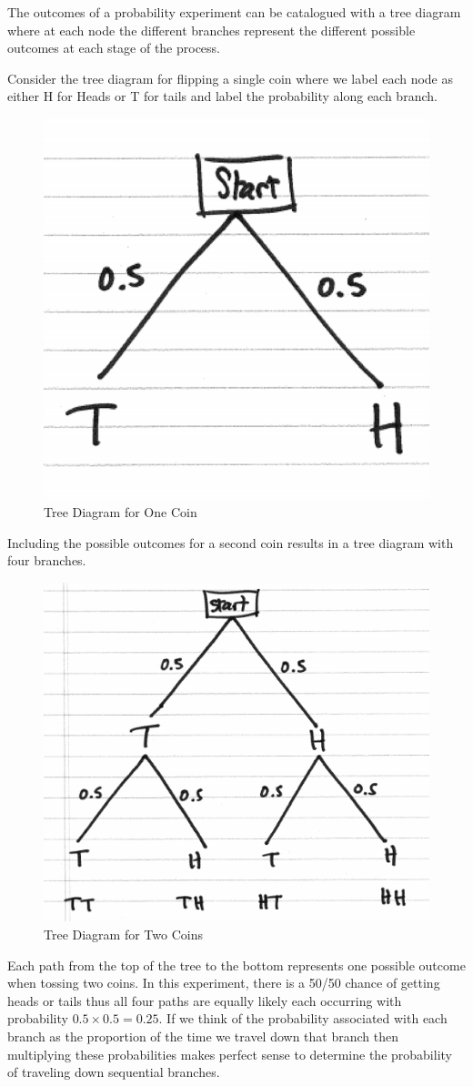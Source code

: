 \documentclass[]{book}
\theoremstyle{definition}
\theoremstyle{definition}
\theoremstyle{definition}
\theoremstyle{remark}
\begin{document}
The outcomes of a probability experiment can be catalogued with a tree
diagram where at each node the different branches represent the
different possible outcomes at each stage of the process.

Consider the tree diagram for flipping a single coin where we label each
node as either H for Heads or T for tails and label the probability
along each branch.

\begin{figure}

{\centering \includegraphics[width=0.3\linewidth]{01-basics-figures/tree_one_coin} 

}

\caption{Tree Diagram for One Coin}\label{fig:nice-fig-33}
\end{figure}

Including the possible outcomes for a second coin results in a tree
diagram with four branches.

\begin{figure}

{\centering \includegraphics[width=0.6\linewidth]{01-basics-figures/tree_two_coins} 

}

\caption{Tree Diagram for Two Coins}\label{fig:nice-fig-34}
\end{figure}

Each path from the top of the tree to the bottom represents one possible
outcome when tossing two coins. In this experiment, there is a 50/50
chance of getting heads or tails thus all four paths are equally likely
each occurring with probability \(0.5 \times 0.5 = 0.25\). If we think
of the probability associated with each branch as the proportion of the
time we travel down that branch then multiplying these probabilities
makes perfect sense to determine the probability of traveling down
sequential branches.
\end{document}
